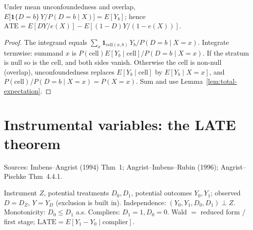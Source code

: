 \begin{theorem}
\label{thm:ipw}
\leanok
{}
Under mean unconfoundedness and overlap,
$E\big[\mathbf 1\{D = b\}\,Y / P(D = b\mid X)\big] = E[Y_b]$; hence
$\mathrm{ATE} = E[DY/e(X)] - E[(1-D)Y/(1-e(X))]$.
\end{theorem}
\begin{proof}
\leanok
{}
The integrand equals $\sum_x \mathbf 1_{\text{cell}(x,b)}\,Y_b / P(D=b\mid X=x)$. Integrate termwise:
summand $x$ is $P(\text{cell})E[Y_b\mid\text{cell}]/P(D=b\mid X=x)$. If the stratum is null so is the cell, and
both sides vanish. Otherwise the cell is non-null (overlap), unconfoundedness replaces $E[Y_b\mid\text{cell}]$ by
$E[Y_b\mid X=x]$, and $P(\text{cell})/P(D=b\mid X=x) = P(X=x)$. Sum and use
Lemma~\ref{lem:total-expectation}.
\end{proof}

\section{Instrumental variables: the LATE theorem}
\label{sec:late}

Sources: Imbens--Angrist (1994) Thm~1; Angrist--Imbens--Rubin (1996); Angrist--Pischke Thm~4.4.1.

\begin{definition}
\label{def:iv-model}
\leanok
{}
Instrument $Z$, potential treatments $D_0, D_1$, potential outcomes $Y_0, Y_1$; observed $D = D_Z$, $Y = Y_D$
(exclusion is built in). Independence: $(Y_0,Y_1,D_0,D_1) \perp Z$. Monotonicity: $D_0 \le D_1$ a.s.
Compliers: $D_1 = 1, D_0 = 0$. Wald $=$ reduced form / first stage; $\mathrm{LATE} = E[Y_1 - Y_0\mid\text{complier}]$.
\end{definition}

